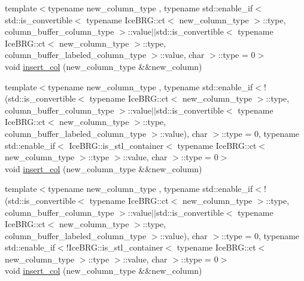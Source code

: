 \begin{DoxyCompactItemize}
\item 
{\footnotesize template$<$typename new\+\_\+column\+\_\+type , typename std\+::enable\+\_\+if$<$ std\+::is\+\_\+convertible$<$ typename Ice\+B\+R\+G\+::ct$<$ new\+\_\+column\+\_\+type $>$\+::type, column\+\_\+buffer\+\_\+column\+\_\+type $>$\+::value$\vert$$\vert$std\+::is\+\_\+convertible$<$ typename Ice\+B\+R\+G\+::ct$<$ new\+\_\+column\+\_\+type $>$\+::type, column\+\_\+buffer\+\_\+labeled\+\_\+column\+\_\+type $>$\+::value, char $>$\+::type  = 0$>$ }\\void \hyperlink{classIceBRG_1_1labeled__array_a8e723034edbd6445725a6fa54a968295}{insert\+\_\+col} (new\+\_\+column\+\_\+type \&\&new\+\_\+column)
\item 
{\footnotesize template$<$typename new\+\_\+column\+\_\+type , typename std\+::enable\+\_\+if$<$!(std\+::is\+\_\+convertible$<$ typename Ice\+B\+R\+G\+::ct$<$ new\+\_\+column\+\_\+type $>$\+::type, column\+\_\+buffer\+\_\+column\+\_\+type $>$\+::value$\vert$$\vert$std\+::is\+\_\+convertible$<$ typename Ice\+B\+R\+G\+::ct$<$ new\+\_\+column\+\_\+type $>$\+::type, column\+\_\+buffer\+\_\+labeled\+\_\+column\+\_\+type $>$\+::value), char $>$\+::type  = 0, typename std\+::enable\+\_\+if$<$ Ice\+B\+R\+G\+::is\+\_\+stl\+\_\+container$<$ typename Ice\+B\+R\+G\+::ct$<$ new\+\_\+column\+\_\+type $>$\+::type $>$\+::value, char $>$\+::type  = 0$>$ }\\void \hyperlink{classIceBRG_1_1labeled__array_a5d21be9c26c21961cab3a2404c68aab1}{insert\+\_\+col} (new\+\_\+column\+\_\+type \&\&new\+\_\+column)
\item 
{\footnotesize template$<$typename new\+\_\+column\+\_\+type , typename std\+::enable\+\_\+if$<$!(std\+::is\+\_\+convertible$<$ typename Ice\+B\+R\+G\+::ct$<$ new\+\_\+column\+\_\+type $>$\+::type, column\+\_\+buffer\+\_\+column\+\_\+type $>$\+::value$\vert$$\vert$std\+::is\+\_\+convertible$<$ typename Ice\+B\+R\+G\+::ct$<$ new\+\_\+column\+\_\+type $>$\+::type, column\+\_\+buffer\+\_\+labeled\+\_\+column\+\_\+type $>$\+::value), char $>$\+::type  = 0, typename std\+::enable\+\_\+if$<$!\+Ice\+B\+R\+G\+::is\+\_\+stl\+\_\+container$<$ typename Ice\+B\+R\+G\+::ct$<$ new\+\_\+column\+\_\+type $>$\+::type $>$\+::value, char $>$\+::type  = 0$>$ }\\void \hyperlink{classIceBRG_1_1labeled__array_a5d21be9c26c21961cab3a2404c68aab1}{insert\+\_\+col} (new\+\_\+column\+\_\+type \&\&new\+\_\+column)
\item 

\end{DoxyCompactItemize}
